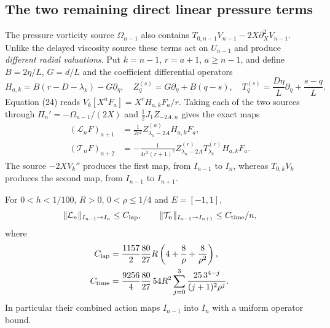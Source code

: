 \subsection{The two remaining direct linear pressure terms}
\label{subsec:remaining-linear-pressure}

The pressure vorticity source $\Omega_{n-1}$ also contains
$T_{0,n-1}V_{n-1}-2X\partial_X^2V_{n-1}$. Unlike the delayed
viscosity source these terms act on $U_{n-1}$ and produce
\emph{different radial valuations}. Put $k=n-1$, $r=a+1$,
$a\ge n-1$, and define $B=2\eta/L$, $G=d/L$ and the coefficient
differential operators
\[
H_{a,k}=B(r-D-\lambda_k)-G\partial_\eta,\quad
Z_q^{(s)}=G\partial_\eta+B(q-s),\quad
T_q^{(s)}=\frac{D\eta}{L}\partial_\eta+\frac{s-q}{L}.
\]
Equation (24) reads $V_k[X^aF_a]=X^rH_{a,k}F_a/r$.
Taking each of the two sources through
$\Pi_n'=-\Omega_{n-1}/(2X)$ and $\frac12J_1Z_{-2A,n}$
gives the exact maps
\begin{align}
(\mathcal L_nF)_{a+1}
 &=\frac1{2r^2}Z_{\lambda_n-2A}^{(a)}H_{a,k}F_a,
\label{eq:radialpressure}\\
(\mathcal T_nF)_{a+2}
 &=-\frac1{4r^2(r+1)^2}
 Z_{\lambda_n-2A}^{(r)}T_{\lambda_k}^{(r)}H_{a,k}F_a.
\label{eq:timepressure}
\end{align}
The source $-2XV_k''$ produces the first map, from
$I_{n-1}$ to $I_n$, whereas $T_{0,k}V_k$ produces the
second map, from $I_{n-1}$ to $I_{n+1}$.

\begin{theorem}
For $0<h<1/100$, $R>0$, $0<\rho\le1/4$ and $E=[-1,1]$,
\[
\|\mathcal L_n\|_{I_{n-1}\to I_n}\le C_{\rm lap},\qquad
\|\mathcal T_n\|_{I_{n-1}\to I_{n+1}}\le C_{\rm time}/n,
\]
where
\begin{align*}
C_{\rm lap}&=\frac{1157}{2}\frac{80}{27}R
 \left(4+\frac8\rho+\frac8{\rho^2}\right),\\
C_{\rm time}&=\frac{9256}{4}\frac{80}{27}\,54R^2
 \sum_{j=0}^3\frac{25\,3^{4-j}}{(j+1)^2\rho^j}.
\end{align*}
In particular their combined action maps $I_{n-1}$ into
$I_n$ with a uniform operator bound.
\end{theorem}

